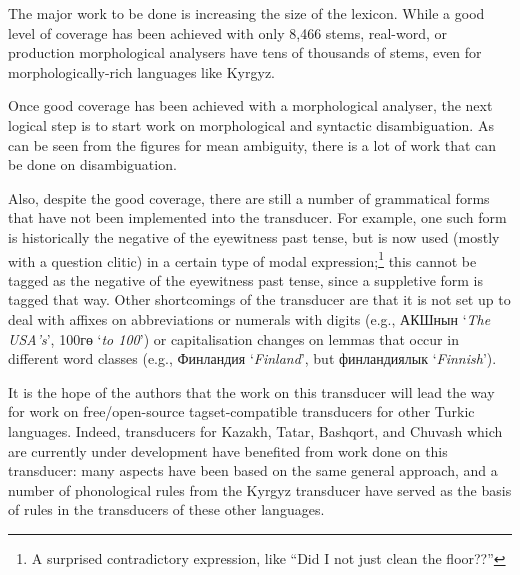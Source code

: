\documentclass[10pt,a4paper,twocolumn]{article}
\newcommand{\eng}[1]{`{\em #1}'}
\begin{document}
The major work to be done is increasing the size of the lexicon. While a good level of coverage has been achieved with only 8,466 stems, real-word, or production morphological analysers have tens of thousands of stems, even for morphologically-rich languages like Kyrgyz.

Once good coverage has been achieved with a morphological analyser, the next logical step is to start work on morphological and syntactic disambiguation. As can be seen from the figures for mean ambiguity, there is a lot of work that can be done on disambiguation.

Also, despite the good coverage, there are still a number of grammatical forms that have not been implemented into the transducer.  For example, one such form is historically the negative of the eyewitness past tense, but is now used (mostly with a question clitic) in a certain type of modal expression;\footnote{A surprised contradictory expression, like ``Did I not just clean the floor??''} this cannot be tagged as the negative of the eyewitness past tense, since a suppletive form is tagged that way.  Other shortcomings of the transducer are that it is not set up to deal with affixes on abbreviations or numerals with digits (e.g., АКШнын \eng{The USA's}, 100гө \eng{to 100}) or capitalisation changes on lemmas that occur in different word classes (e.g., Финландия \eng{Finland}, but финландиялык \eng{Finnish}).


It is the hope of the authors that the work on this transducer will lead the way for work on free/open-source tagset-compatible transducers for other Turkic languages.  Indeed, transducers for Kazakh, Tatar, Bashqort, and Chuvash which are currently under development have benefited from work done on this transducer: many aspects have been based on the same general approach, and a number of phonological rules from the Kyrgyz transducer have served as the basis of rules in the transducers of these other languages.
\end{document}
